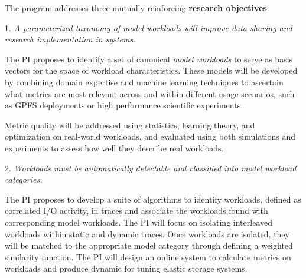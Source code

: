 The program addresses three mutually reinforcing \textbf{research objectives}.
\begin{myitemize}

\item[1.]
\emph{A parameterized taxonomy of \textit{model workloads} will improve data sharing and research implementation in systems.}

The PI proposes to identify a set of canonical \textit{model workloads} to serve as basis vectors for the space
of workload characteristics.  These models will be developed by combining domain expertise and machine learning techniques to ascertain what
metrics are most relevant across and within different usage scenarios, such as
GPFS deployments or high performance scientific experiments.  

Metric quality will be addressed using
statistics, learning theory, and optimization on 
real-world workloads, and evaluated using both simulations and experiments to assess how well they describe real workloads.

\item[2.]
\emph{Workloads must be automatically detectable and classified into
\textit{model workload} categories.}

The PI proposes to develop a suite of algorithms to identify workloads, defined
as correlated I/O activity, in traces and associate the workloads found with
corresponding model workloads. The PI will focus on isolating interleaved
workloads within static and dynamic traces. Once workloads are isolated, they
will be matched to the appropriate model category through defining a weighted
similarity function. The PI will design an online system to calculate metrics
on workloads and produce dynamic %
for tuning elastic storage systems.


\end{myitemize}
